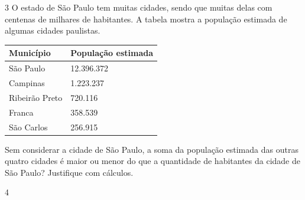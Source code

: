 
\num{3} O estado de São Paulo tem muitas cidades, sendo que muitas delas com
centenas de milhares de habitantes. A tabela mostra a população estimada
de algumas cidades paulistas.

\begin{longtable}[]{@{}ll@{}}
\toprule
Município & População estimada\tabularnewline
\midrule
\endhead
São Paulo & 12.396.372\tabularnewline
Campinas & 1.223.237\tabularnewline
Ribeirão Preto & 720.116\tabularnewline
Franca & 358.539\tabularnewline
São Carlos & 256.915\tabularnewline
\bottomrule
\end{longtable}


Sem considerar a cidade de São Paulo, a soma da população estimada das
outras quatro cidades é maior ou menor do que a quantidade de habitantes
da cidade de São Paulo? Justifique com cálculos.

\begin{emptybox}

\vspace*{2cm}
\end{emptybox}

\num{4}

